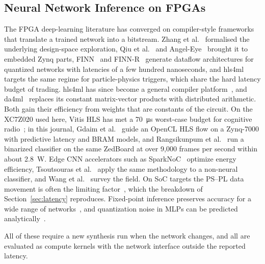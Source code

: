 \documentclass[final,5p,times,twocolumn]{elsarticle}
\begin{document}
\subsection{Neural Network Inference on FPGAs}
The FPGA deep-learning literature has converged on compiler-style frameworks
that translate a trained network into a bitstream. Zhang et
al.~\cite{Zhang2015} formalised the underlying design-space exploration, Qiu et
al.~\cite{Qiu2016} and Angel-Eye~\cite{Guo2018} brought it to embedded Zynq
parts, FINN~\cite{Umuroglu2017} and FINN-R~\cite{Blott2018} generate dataflow
architectures for quantized networks with latencies of a few hundred
nanoseconds, and hls4ml~\cite{Duarte2018} targets the same regime for
particle-physics triggers, which share the hard latency budget of trading.
hls4ml has since become a general compiler platform~\cite{Schulte2026}, and
da4ml~\cite{Sun2026} replaces its constant matrix-vector products with
distributed arithmetic. Both gain their efficiency from weights that are
constants of the circuit. On the XC7Z020 used here, Vitis HLS has met a
\SI{70}{\micro\second} worst-case budget for cognitive radio~\cite{deBroglie2024};
in this journal, Gdaim et al.~\cite{Gdaim2026} guide an OpenCL HLS flow on a
Zynq-7000 with predictive latency and BRAM models, and Rangsikunpum et
al.~\cite{Rangsikunpum2026} run a binarized classifier on the same ZedBoard at
over 9{,}000 frames per second within about \SI{2.8}{\watt}. Edge CNN
accelerators such as SparkNoC~\cite{sparknoc} optimize energy efficiency,
Tsoutsouras et al.~\cite{Tsoutsouras2017} apply the same methodology to a
non-neural classifier, and Wang et al.~\cite{Wang2019survey} survey the field.
On SoC targets the PS--PL data movement is often the limiting
factor~\cite{RiosNavarro2018}, which the breakdown of Section~\ref{sec:latency}
reproduces. Fixed-point inference preserves accuracy for a wide range of
networks~\cite{Jacob2018,Hubara2017,Gholami2021}, and quantization noise in MLPs
can be predicted analytically~\cite{AlRikabi2024}.

All of these require a new synthesis run when the network changes, and all are
evaluated as compute kernels with the network interface outside the reported
latency.
\end{document}
